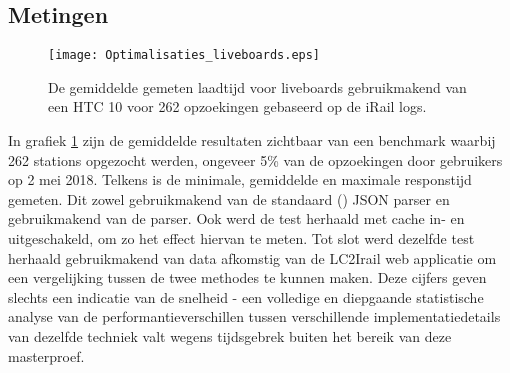 \subsection{Metingen}
\begin{figure}[h]
	\centering
	\texttt{[image: Optimalisaties\_liveboards.eps]}
		\caption[Gemeten laadtijd liveboards]{De gemiddelde gemeten laadtijd voor liveboards gebruikmakend van een HTC 10 voor 262 opzoekingen gebaseerd op de iRail logs. }
	\label{fig:liveboardlabtest}
\end{figure}
%		

In grafiek \ref{fig:liveboardlabtest} zijn de gemiddelde resultaten zichtbaar van een benchmark waarbij 262 stations opgezocht werden, ongeveer 5\% van de opzoekingen door gebruikers op 2 mei 2018. Telkens is de minimale, gemiddelde en maximale responstijd gemeten. Dit zowel gebruikmakend van de standaard () JSON parser en gebruikmakend van de  parser. Ook werd de test herhaald met cache in- en uitgeschakeld, om zo het effect hiervan te meten. Tot slot werd dezelfde test herhaald gebruikmakend van data afkomstig van de LC2Irail web applicatie om een vergelijking tussen de twee methodes te kunnen maken. Deze cijfers geven slechts een indicatie van de snelheid - een volledige en diepgaande statistische analyse van de performantieverschillen tussen verschillende implementatiedetails van dezelfde techniek valt wegens tijdsgebrek buiten het bereik van deze masterproef.

